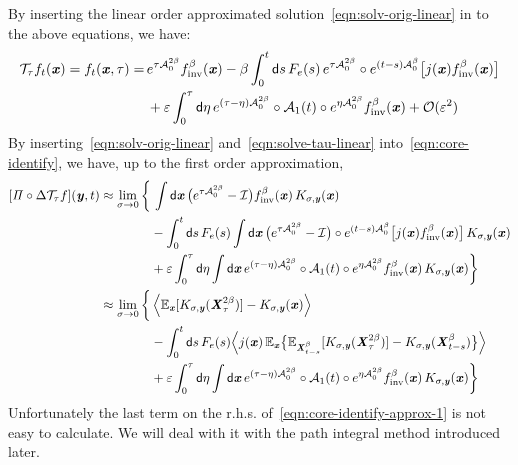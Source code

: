 \documentclass[aip,jcp,a4paper,reprint,onecolumn]{revtex4-1}
\newcommand{\vect}[1]{\textbf{\textit{#1}}}
\newcommand{\dd}{\textsf{d}}
\newcommand{\inv}{\textrm{inv}}
\newcommand{\mt}{\mathcal T}
\newcommand{\mo}{\mathcal O}
\newcommand{\mi}{\mathcal I}
\newcommand{\proj}{\mathit\Pi}
\newcommand{\fwg}{{\mathcal A}}
\begin{document}
By inserting the linear order approximated solution~\eqref{eqn:solv-orig-linear}
in to the above equations, we have:
\begin{align}\nonumber
  \mt_\tau f_t(\vect x)=
  f_{t}(\vect x, \tau)
  =&\,
  e^{\tau\fwg^{2\beta}_0} f_{\inv}^\beta(\vect x) -
  \beta
  \int_0^t\dd s\,
  F_e(s)\,
  e^{\tau\fwg^{2\beta}_0} \circ
  e^{(t-s)\fwg^\beta_0}
  \big[
  j(\vect x)
  f_{\inv}^\beta(\vect x)
  \big]
  \\\label{eqn:solve-tau-linear}
  &\,+ \varepsilon
  \int_0^\tau\dd \eta\,
  e^{(\tau-\eta)\fwg^{2\beta}_0}\circ
  \fwg_1(t)\circ
  e^{\eta\fwg^{2\beta}_0}f_{\inv}^\beta(\vect x)  + \mo(\varepsilon^2)
\end{align}
By inserting~\eqref{eqn:solv-orig-linear} and~\eqref{eqn:solve-tau-linear}
into~\eqref{eqn:core-identify}, we have, up to the first order
approximation,
\begin{align}\nonumber
  [\proj\circ\Delta\mt_\tau f](\vect y, t)
  \approx
  \lim_{\sigma \rightarrow 0}
  \bigg\{
    &\,
    \int \dd \vect x\,
    \big(e^{\tau\fwg_0^{2\beta}}-\mi\big)
    f_{\inv}^\beta(\vect x)\,
    K_{\sigma,\vect y}(\vect x)\\\nonumber
    &
    - \int_0^t\dd s\,
    F_e(s)
    \int\dd \vect x\,
    \big(e^{\tau\fwg^{2\beta}_0} - \mi\big)\circ
    e^{(t-s)\fwg^\beta_0}
    \big[
    j(\vect x)
    f_{\inv}^\beta(\vect x)
    \big]\, K_{\sigma,\vect y}(\vect x) \\\nonumber
    &
    +
    \varepsilon
    \int_0^\tau\dd \eta
    \int\dd \vect x\,
    e^{(\tau-\eta)\fwg^{2\beta}_0}\circ
    \fwg_1(t)\circ
    e^{\eta\fwg^{2\beta}_0}f_{\inv}^\beta(\vect x)\,K_{\sigma,\vect y}(\vect x)
    \bigg\}     \\\nonumber
  \approx
  \lim_{\sigma \rightarrow 0}
  \bigg\{
  &\,
    \Big\langle
    \mathbb E_{\vect x}[ K_{\sigma,\vect y}(\vect X^{2\beta}_\tau) ]
    - K_{\sigma,\vect y}(\vect x)
    \Big\rangle\\\nonumber
    &
    - \int_0^t\dd s\,
    F_e(s)
    \Big\langle
    j(\vect x)\,
    \mathbb E_{\vect x}\big\{
    \mathbb E_{\vect X_{t-s}^\beta}[
    K_{\sigma,\vect y}(\vect X_\tau^{2\beta})
    ]
    -
    K_{\sigma,\vect y}(\vect X_{t-s}^\beta)
    \big\}
    \Big\rangle\\\label{eqn:core-identify-approx-1}
    &
    +
    \varepsilon
    \int_0^\tau\dd \eta
    \int\dd \vect x\,
    e^{(\tau-\eta)\fwg^{2\beta}_0}\circ
    \fwg_1(t)\circ
    e^{\eta\fwg^{2\beta}_0}f_{\inv}^\beta(\vect x)\,K_{\sigma,\vect y}(\vect x)
    \bigg\}     
\end{align}
Unfortunately the last term on the r.h.s. of~\eqref{eqn:core-identify-approx-1}
is not easy to calculate. We will deal with it with
the path integral method introduced later.
\end{document}
